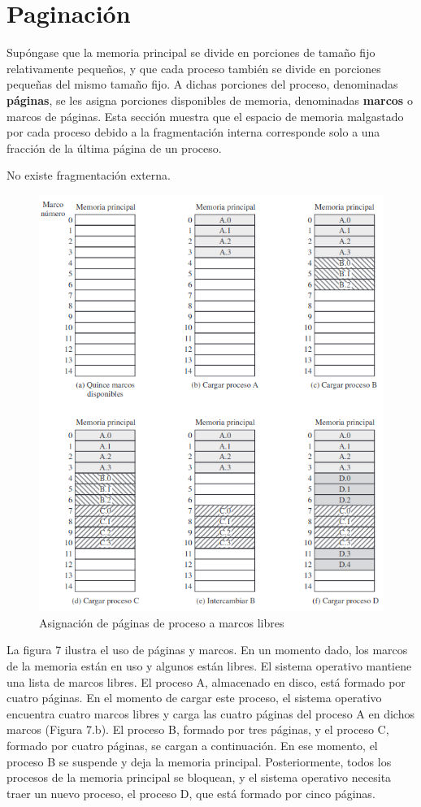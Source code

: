 \documentclass[12pt,a4paper]{article}
\begin{document}
\section{Paginación}
Supóngase que la memoria principal se divide en porciones de tamaño fijo relativamente pequeños, y que cada proceso también se divide en porciones pequeñas del mismo tamaño fijo. A dichas porciones del proceso, denominadas \textbf{páginas}, se les asigna porciones disponibles de memoria, denominadas \textbf{marcos} o marcos de páginas. Esta sección muestra que el espacio de memoria malgastado por cada proceso debido a la fragmentación interna corresponde solo a una fracción de la última página de un proceso.
\begin{tcolorbox}[colback=cyan!10, colframe=blue!70, title=Nota]
    No existe fragmentación externa.
\end{tcolorbox}
\begin{figure}[H]
    \centering
    \includegraphics[width=15cm]{marco.png}
    \caption{Asignación de páginas de proceso a marcos libres}
\end{figure}
La figura 7 ilustra el uso de páginas y marcos. En un momento dado, los marcos de la memoria están en uso y algunos están libres. El sistema operativo mantiene una lista de marcos libres. El proceso A, almacenado en disco, está formado por cuatro páginas. En el momento de cargar este proceso, el sistema operativo encuentra cuatro marcos libres y carga las cuatro páginas del proceso A en dichos marcos (Figura 7.b). El proceso B, formado por tres páginas, y el proceso C, formado por cuatro páginas, se cargan a continuación. En ese momento, el proceso B se suspende y deja la memoria principal. Posteriormente, todos los procesos de la memoria principal se bloquean, y el sistema operativo necesita traer un nuevo proceso, el proceso D, que está formado por cinco páginas.
\end{document}
